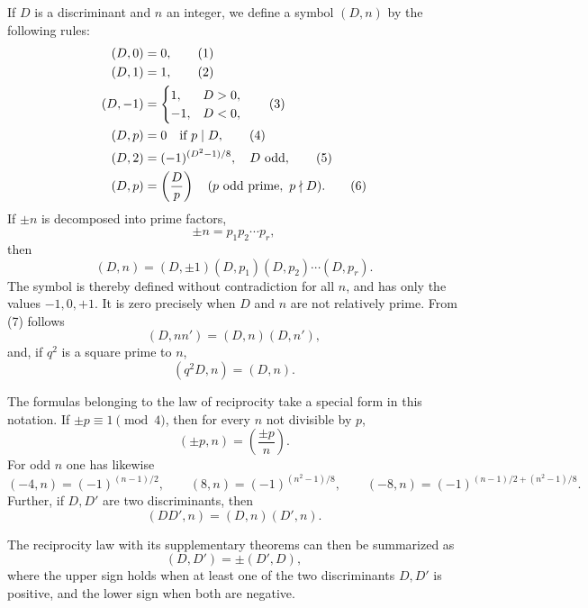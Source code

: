 \documentclass[11pt]{article}
\newcommand{\Jac}[2]{\left(\frac{#1}{#2}\right)}
\begin{document}
If \(D\) is a discriminant and \(n\) an integer, we define a symbol \((D,n)\) by the following rules:
\begin{align}
        (D,0)&=0,\tag{1}\\
        (D,1)&=1,\tag{2}\\
        (D,-1)&=\begin{cases}1,&D>0,\\ -1,&D<0,\end{cases}\tag{3}\\
        (D,p)&=0\quad\hbox{if }p\mid D,\tag{4}\\
        (D,2)&=(-1)^{(D^2-1)/8},\quad D\hbox{ odd},\tag{5}\\
        (D,p)&=\Jac{D}{p}\quad(p\hbox{ odd prime},\ p\nmid D).\tag{6}
\end{align}
If \(\pm n\) is decomposed into prime factors,
\[
        \pm n=p_1p_2\cdots p_r,
\]
then
\begin{equation}
        (D,n)=(D,\pm1)(D,p_1)(D,p_2)\cdots(D,p_r).
\tag{7}
\end{equation}
The symbol is thereby defined without contradiction for all \(n\), and has only the values \(-1,0,+1\).  It is zero precisely when \(D\) and \(n\) are not relatively prime.  From (7) follows
\begin{equation}
        (D,nn')=(D,n)(D,n'),
\tag{8}
\end{equation}
and, if \(q^2\) is a square prime to \(n\),
\begin{equation}
        (q^2D,n)=(D,n).
\tag{9}
\end{equation}

The formulas belonging to the law of reciprocity take a special form in this notation.  If \(\pm p\equiv1\pmod4\), then for every \(n\) not divisible by \(p\),
\begin{equation}
        (\pm p,n)=\Jac{\pm p}{n}.
\tag{10}
\end{equation}
For odd \(n\) one has likewise
\begin{equation}
        (-4,n)=(-1)^{(n-1)/2},\qquad
        (8,n)=(-1)^{(n^2-1)/8},\qquad
        (-8,n)=(-1)^{(n-1)/2+(n^2-1)/8}.
\tag{11}
\end{equation}
Further, if \(D,D'\) are two discriminants, then
\begin{equation}
        (DD',n)=(D,n)(D',n).
\tag{12}
\end{equation}

The reciprocity law with its supplementary theorems can then be summarized as
\begin{equation}
        (D,D')=\pm(D',D),
\tag{13}
\end{equation}
where the upper sign holds when at least one of the two discriminants \(D,D'\) is positive, and the lower sign when both are negative.
\end{document}
